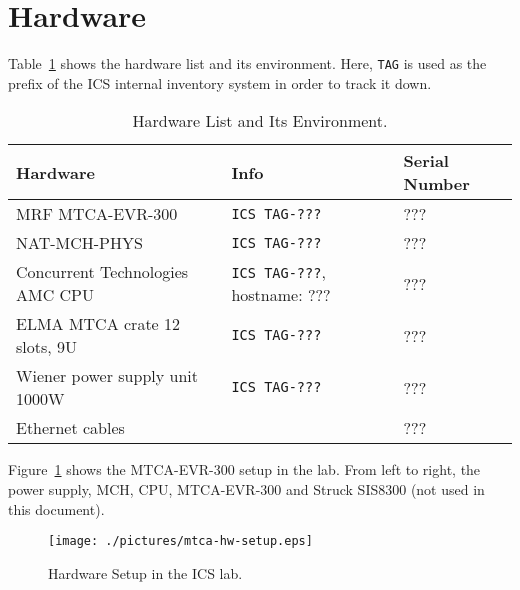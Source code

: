 \documentclass[11pt
  , a4paper
  , article
  , oneside
  , showtrims
]{memoir}
\begin{document}
\section{Hardware}
Table~\ref{table:hwlist} shows the hardware list and its environment. Here, \texttt{TAG} is used as the prefix of the ICS internal inventory system in order to track it down.
\begin{table}[!hb]
  \centering
  \begin{tabular}{l|l|l}
    \toprule
    Hardware                        & Info                                               & Serial Number \\\midrule
    MRF MTCA-EVR-300                & \texttt{ICS TAG-???}                               & ???       \\\midrule
    NAT-MCH-PHYS                    & \texttt{ICS TAG-???}                               & ???    \\\midrule
    Concurrent Technologies AMC CPU & \texttt{ICS TAG-???}, hostname: ???                & ???     \\\midrule
    ELMA MTCA crate 12 slots, 9U    & \texttt{ICS TAG-???}                               & ???      \\\midrule
    Wiener power supply unit 1000W  & \texttt{ICS TAG-???}                               & ???       \\\midrule
    Ethernet cables                 &                                                    & ???              \\\bottomrule
  \end{tabular}
  \caption[]{Hardware List and Its Environment.}
  \label{table:hwlist}
\end{table}


Figure~\ref{fig:mtca-hw-setup} shows the MTCA-EVR-300 setup in the lab. From left to right, the power supply, MCH, CPU, MTCA-EVR-300 and Struck SIS8300 (not used in this document).
\begin{figure}[!b]
  \centering
  \texttt{[image: ./pictures/mtca-hw-setup.eps]}
  \caption{Hardware Setup in the ICS lab.}
  \label{fig:mtca-hw-setup}   
\end{figure}


\clearpage
\end{document}
